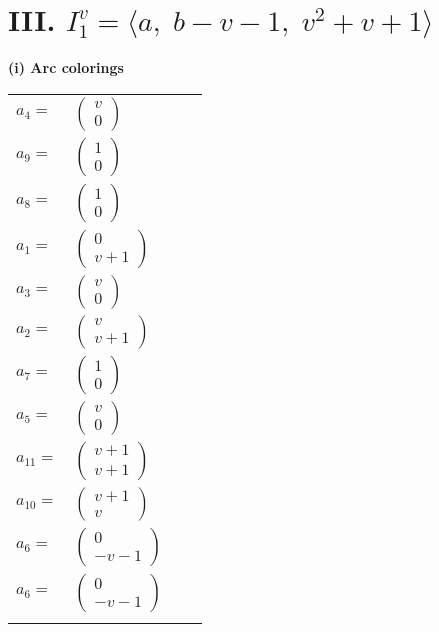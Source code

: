 \documentclass[1p]{elsarticle_modified}
\theoremstyle{definition}
\begin{document}
\centering \section*{III. $I^v_{1}= \langle a,\;b- v-1,\;v^2+v+1 \rangle$}
\flushleft \textbf{(i) Arc colorings}\\
\begin{tabular}{m{7pt} m{180pt} m{7pt} m{180pt} }
\flushright $a_{4}=$&$\begin{pmatrix}v\\0\end{pmatrix}$ \\
\flushright $a_{9}=$&$\begin{pmatrix}1\\0\end{pmatrix}$ \\
\flushright $a_{8}=$&$\begin{pmatrix}1\\0\end{pmatrix}$ \\
\flushright $a_{1}=$&$\begin{pmatrix}0\\v+1\end{pmatrix}$ \\
\flushright $a_{3}=$&$\begin{pmatrix}v\\0\end{pmatrix}$ \\
\flushright $a_{2}=$&$\begin{pmatrix}v\\v+1\end{pmatrix}$ \\
\flushright $a_{7}=$&$\begin{pmatrix}1\\0\end{pmatrix}$ \\
\flushright $a_{5}=$&$\begin{pmatrix}v\\0\end{pmatrix}$ \\
\flushright $a_{11}=$&$\begin{pmatrix}v+1\\v+1\end{pmatrix}$ \\
\flushright $a_{10}=$&$\begin{pmatrix}v+1\\v\end{pmatrix}$ \\
\flushright $a_{6}=$&$\begin{pmatrix}0\\- v-1\end{pmatrix}$\\ \flushright $a_{6}=$&$\begin{pmatrix}0\\- v-1\end{pmatrix}$\\&\end{tabular}
\end{document}
